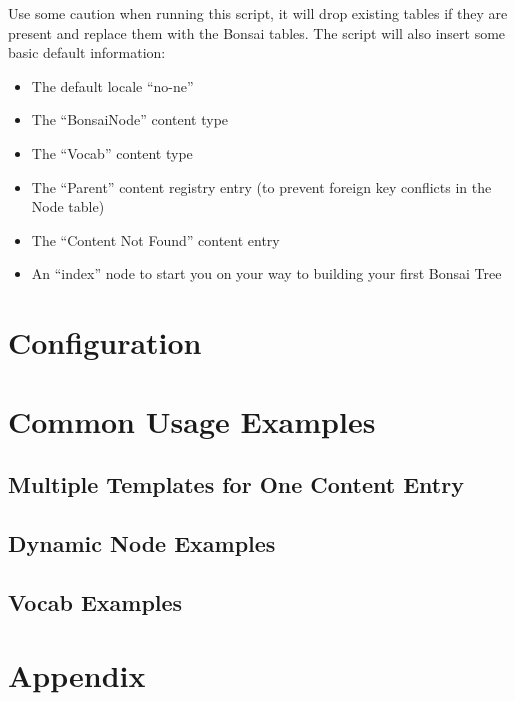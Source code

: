 \documentclass[]{book}
\begin{document}
Use some caution when running this script, it will drop existing tables if they are present and replace them with the Bonsai tables. The script will also insert some basic default information:

\begin{itemize}
	\item The default locale \enquote{no-ne}
	\item The \enquote{BonsaiNode} content type
	\item The \enquote{Vocab} content type
	\item The \enquote{Parent} content registry entry (to prevent foreign key conflicts in the Node table)
	\item The \enquote{Content Not Found} content entry
	\item An \enquote{index} node to start you on your way to building your first Bonsai Tree
\end{itemize}

\chapter{Configuration}

\chapter{Common Usage Examples}
\label{chapter:commonUsageExamples}

\section{Multiple Templates for One Content Entry}
\label{sec:multipleTemplates}

\section{Dynamic Node Examples}
\label{sec:dynamicNode}

\section{Vocab Examples}
\label{sec:vocabExamples}

\chapter*{Appendix}
\end{document}

